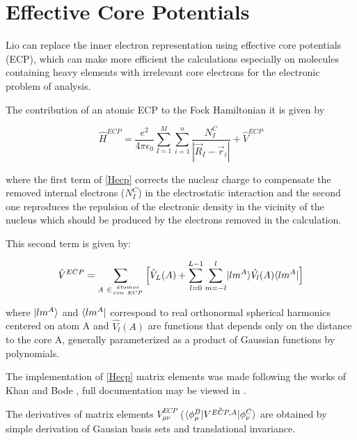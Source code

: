 \section{Effective Core Potentials}

   Lio can replace the inner electron representation using effective core potentials (ECP), which can make more efficient the calculations especially on molecules containing heavy elements with irrelevant core electrons for the electronic problem of analysis.
   
   The contribution of an atomic ECP to the Fock Hamiltonian it is given by \cite{ECP_kahn}
   
   \begin{equation}
     \hat{H}^{ECP} =  \frac{e^2}{4\pi \epsilon_0} \sum_{I=1}^{M} \sum_{i=1}^{n} \frac{N_I^{C}}{|\vec{R}_I-\vec{r}_i|} + \hat{V}^{ECP} 
     \label{Hecp}
   \end{equation}

   where the first term of \ref{Hecp} corrects the nuclear charge to compensate the removed internal electrons ($N_I^{C}$) in the electrostatic interaction and the second one reproduces the repulsion of the electronic density in the vicinity of the nucleus which should be produced by the electrons removed in the calculation.

   This second term is given by:
  
  \begin{equation}
    \hat{V}^{ECP} =  \sum_{A\ \in { \genfrac{}{}{0pt}{}{\acute{a}tomos}{con\ ECP} }} \Big[ 
    \hat{V}_L(A) + \sum_{l=0}^{L-1} \sum_{m=-l}^{l} \ket{lm^A}\hat{V_{l}}(A) \bra{lm^A} \Big]
    \label{Vecp}
  \end{equation}

  where $\lvert lm^A\rangle$ and $\langle lm^A\rvert$ correspond to real orthonormal spherical harmonics centered on atom A and $\hat{V_{l}}(A)$ are functions that depends only on the distance to the core A, generally parameterized as a product of Gaussian functions by polynomials.
  
  The implementation of \ref{Hecp} matrix elements was made following the works of Khan \cite{ECP_kahn} and Bode \cite{Bode_ECP}, full documentation may be viewed in \cite{Tesis_Nick}.
  
  The derivatives of matrix elements  $V^{ECP}_{\mu \nu}$ ($\langle\phi_\mu^B\rvert{\hat{V^{ECP,A}}}\lvert\phi_\nu^C\rangle$ are obtained by simple derivation of Gausian basis sets and translational invariance.\cite{szabo}
  
